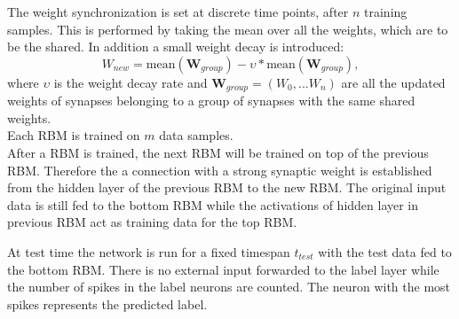 The weight synchronization is set at discrete time points, after $n$ training samples.
This is performed by taking the mean over all the weights, which are to be the shared.
In addition a small weight decay is introduced:
\[
W_{new} = \text{mean}(\textbf{W}_{group}) - \upsilon * \text{mean}(\textbf{W}_{group}) , 
\]
where $\upsilon$ is the weight decay rate and $\textbf{W}_{group} = (W_0 ,... W_n)$ are all the updated weights of synapses belonging to a group of synapses with the same shared weights.
\\
Each RBM is trained on $m$ data samples.
\\
After a RBM is trained, the next RBM will be trained on top of the previous RBM.
Therefore the a connection with a strong synaptic weight is established from the hidden layer of the previous RBM to the new RBM.
The original input data is still fed to the bottom RBM while the activations of hidden layer in previous RBM act as training data for the top RBM.


At test time the network is run for a fixed timespan $t_{test}$ with the test data fed to the bottom RBM.
There is no external input forwarded to the label layer while the number of spikes in the label neurons are counted.
The neuron with the most spikes represents the predicted label.  

 